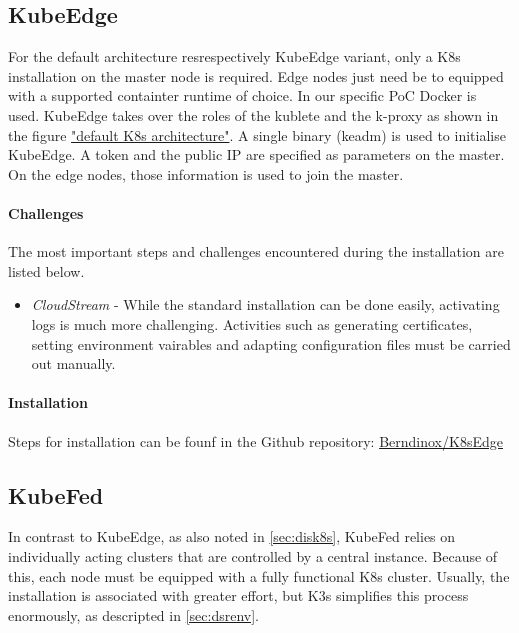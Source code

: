 \documentclass[MSC,Master,english]{twbook}%
\begin{document}
\subsection{KubeEdge}
\label{sec:dsrenvke}
For the default architecture resrespectively KubeEdge variant, only a \ac{K8s} installation on the master node is required. Edge nodes just need be to equipped with a supported containter runtime of choice. In our specific \ac{PoC} Docker is used. KubeEdge takes over the roles of the kublete and the k-proxy as shown in the figure \hyperref[fig:k8s-default]{"default K8s architecture"}. A single binary (keadm) is used to initialise KubeEdge. A token and the public IP are specified as parameters on the master. On the edge nodes, those information is used to join the master. 

\paragraph{Challenges} The most important steps and challenges encountered during the installation are listed below.

\begin{itemize}
    \item \textit{CloudStream} - While the standard installation can be done easily, activating logs is much more challenging. Activities such as generating certificates, setting environment vairables and adapting configuration files must be carried out manually.
\end{itemize}

\paragraph{Installation} Steps for installation can be founf in the Github repository: \hyperref{https://github.com/Berndinox/K8sEdge/blob/main/DOCs/kubeedge-install.md}{}{}{Berndinox/K8sEdge}

\subsection{KubeFed}
\label{sec:dsrenvkf}
In contrast to KubeEdge, as also noted in \autoref{sec:disk8s}, KubeFed relies on individually acting clusters that are controlled by a central instance. Because of this, each node must be equipped with a fully functional \ac{K8s} cluster. Usually, the installation is associated with greater effort, but K3s simplifies this process enormously, as descripted in \autoref{sec:dsrenv}. 
\end{document}
